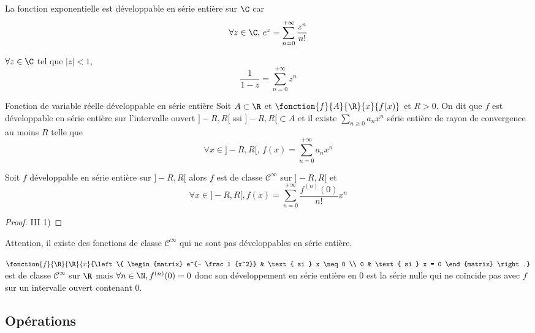 \begin{exemple}
    La fonction exponentielle est développable en série entière sur $\C$ car 
    $$\forall z \in \C, \, e^z = \sum_{n = 0}^{+\infty} \frac{z^n}{n!}$$

    \lvspace $\forall z \in \C$ tel que $|z| < 1$,
    $$\frac 1 {1 - z} = \sum_{n = 0}^{+\infty} z^n$$
\end{exemple}

\begin{definitionnt}{Fonction de variable réelle développable en série entière}{}
    Soit $A \subset \R$ et $\fonction{f}{A}{\R}{x}{f(x)}$ et $R > 0$. On dit que $f$ est développable
    en série entière sur l'intervalle ouvert $]-R, R[$ ssi $]-R, R[ \subset A$ et il 
    existe $\sum_{n \geqslant 0 } a_n x^n$ série entière de rayon de convergence au moins $R$ telle que
    $$\forall x \in ]-R, R[, \, f(x) = \sum_{n = 0}^{+\infty} a_n x^n$$
\end{definitionnt}

\begin{proposition}{}{}
    Soit $f$ développable en série entière sur $] - R, R[$ alors $f$ est de classe
    $\mathscr {C}^\infty$ sur $]-R, R[$ et 
    $$\forall x \in ]-R, R[, 
    f(x) = \sum_{n = 0}^{+\infty} \frac{f^{(n)}(0)}{n!} x^n$$
\end{proposition}

\begin{proof}
    III 1)
\end{proof}

\begin{remarque}
    Attention, il existe des fonctions de classe $\mathscr {C}^\infty$ qui ne sont pas
    développables en série entière.
\end{remarque}

\begin{exemple}
    $\fonction{f}{\R}{\R}{x}{\left\{ \begin{matrix}
        e^{- \frac 1 {x^2}} & \text{ si } x \neq 0 \\
        0 & \text{ si } x = 0
    \end{matrix} \right.}$ est de classe $\mathscr {C}^\infty$ sur $\R$ mais 
    $\forall n \in \N, f^{(n)}(0) = 0$ donc son développement en série entière en $0$ est
    la série nulle qui ne coïncide pas avec $f$ sur un intervalle ouvert contenant $0$.
\end{exemple}

\subsection{Opérations}

